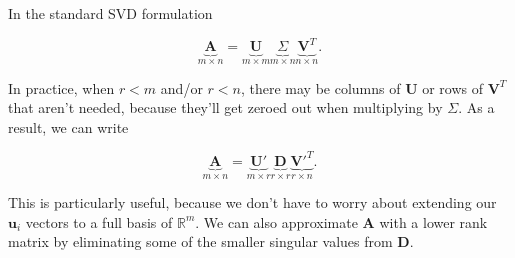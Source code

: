 \documentclass[
]{book}
\theoremstyle{definition}
\theoremstyle{definition}
\theoremstyle{definition}
\theoremstyle{definition}
\theoremstyle{remark}
\begin{document}
In the standard SVD formulation

\[\underbrace{\mathbf{A}}_{m\times n}=\underbrace{\mathbf{U}}_{m\times m}\underbrace{\Sigma}_{m\times n}\underbrace{\mathbf{V}^T}_{n\times n}.\]

In practice, when \(r<m\) and/or \(r<n\), there may be columns of \(\mathbf{U}\) or rows of \(\mathbf{V}^T\) that aren't needed, because they'll get zeroed out when multiplying by \(\Sigma\). As a result, we can write

\[\underbrace{\mathbf{A}}_{m\times n}=\underbrace{\mathbf{U}'}_{m\times r}\underbrace{\mathbf{D}}_{r\times r}\underbrace{\mathbf{V}'^T}_{r\times n}.\]

This is particularly useful, because we don't have to worry about extending our \(\mathbf{u}_i\) vectors to a full basis of \(\mathbb{R}^m\). We can also approximate \(\mathbf{A}\) with a lower rank matrix by eliminating some of the smaller singular values from \(\mathbf{D}.\)
\end{document}
